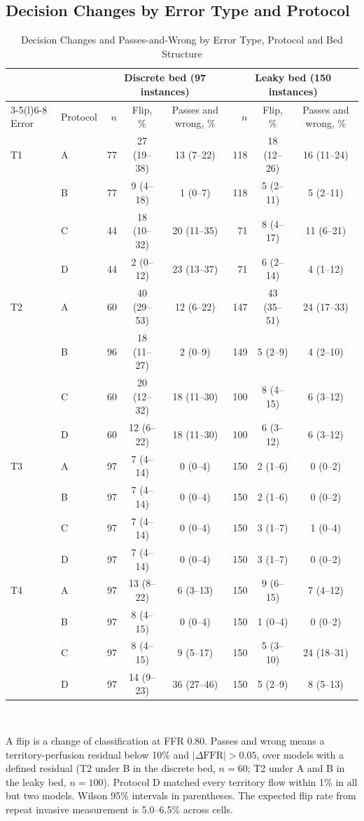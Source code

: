 \documentclass[journal]{IEEEtran}
\begin{document}
\subsection{Decision Changes by Error Type and Protocol}
\begin{table}[!t]
\caption{Decision Changes and Passes-and-Wrong by Error Type, Protocol and Bed Structure}
\label{tab:results}
\centering\footnotesize
\begin{tabular}{@{}llrccrcc@{}}
\toprule
 & & \multicolumn{3}{c}{Discrete bed (97 instances)} & \multicolumn{3}{c}{Leaky bed (150 instances)}\\
\cmidrule(lr){3-5}\cmidrule(l){6-8}
Error & Protocol & $n$ & Flip, \% & Passes and wrong, \% & $n$ & Flip, \% & Passes and wrong, \%\\
\midrule
T1 & A & 77 & 27 (19--38) & 13 (7--22) & 118 & 18 (12--26) & 16 (11--24) \\
 & B & 77 & 9 (4--18) & 1 (0--7) & 118 & 5 (2--11) & 5 (2--11) \\
 & C & 44 & 18 (10--32) & 20 (11--35) & 71 & 8 (4--17) & 11 (6--21) \\
 & D & 44 & 2 (0--12) & 23 (13--37) & 71 & 6 (2--14) & 4 (1--12) \\
\addlinespace[2pt]
T2 & A & 60 & 40 (29--53) & 12 (6--22) & 147 & 43 (35--51) & 24 (17--33) \\
 & B & 96 & 18 (11--27) & 2 (0--9) & 149 & 5 (2--9) & 4 (2--10) \\
 & C & 60 & 20 (12--32) & 18 (11--30) & 100 & 8 (4--15) & 6 (3--12) \\
 & D & 60 & 12 (6--22) & 18 (11--30) & 100 & 6 (3--12) & 6 (3--12) \\
\addlinespace[2pt]
T3 & A & 97 & 7 (4--14) & 0 (0--4) & 150 & 2 (1--6) & 0 (0--2) \\
 & B & 97 & 7 (4--14) & 0 (0--4) & 150 & 2 (1--6) & 0 (0--2) \\
 & C & 97 & 7 (4--14) & 0 (0--4) & 150 & 3 (1--7) & 1 (0--4) \\
 & D & 97 & 7 (4--14) & 0 (0--4) & 150 & 3 (1--7) & 0 (0--2) \\
\addlinespace[2pt]
T4 & A & 97 & 13 (8--22) & 6 (3--13) & 150 & 9 (6--15) & 7 (4--12) \\
 & B & 97 & 8 (4--15) & 0 (0--4) & 150 & 1 (0--4) & 0 (0--2) \\
 & C & 97 & 8 (4--15) & 9 (5--17) & 150 & 5 (3--10) & 24 (18--31) \\
 & D & 97 & 14 (9--23) & 36 (27--46) & 150 & 5 (2--9) & 8 (5--13) \\
\bottomrule
\end{tabular}
\\[2pt]
\parbox{\textwidth}{\footnotesize A flip is a change of classification at FFR 0.80. Passes and wrong means a territory-perfusion residual below 10\% and $|\Delta\mathrm{FFR}| > 0.05$, over models with a defined residual (T2 under B in the discrete
bed, $n = 60$; T2 under A and B in the leaky bed, $n = 100$). Protocol D matched every territory flow within 1\%
in all but two models. Wilson 95\% intervals in parentheses. The expected flip
rate from repeat invasive measurement is 5.0--6.5\% across cells.}
\end{table}
\end{document}
